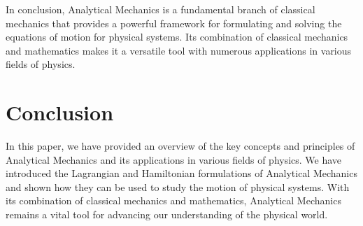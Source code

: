 \documentclass{breport}
\begin{document}
In conclusion, Analytical Mechanics is a fundamental branch of classical mechanics that provides a powerful framework for formulating and solving the equations of motion for physical systems. Its combination of classical mechanics and mathematics makes it a versatile tool with numerous applications in various fields of physics.

\section{Conclusion}
In this paper, we have provided an overview of the key concepts and principles of Analytical Mechanics and its applications in various fields of physics. We have introduced the Lagrangian and Hamiltonian formulations of Analytical Mechanics and shown how they can be used to study the motion of physical systems. With its combination of classical mechanics and mathematics, Analytical Mechanics remains a vital tool for advancing our understanding of the physical world.
\end{document}
